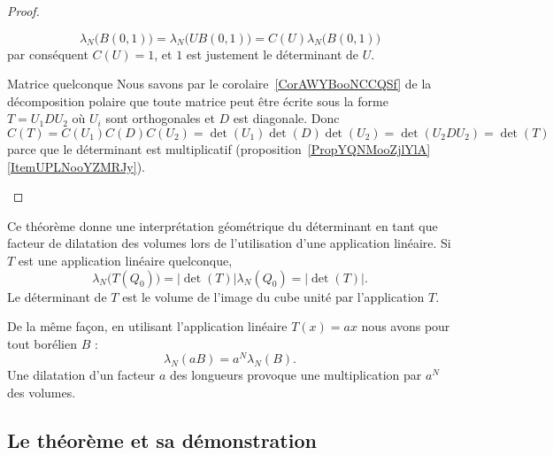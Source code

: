 \begin{proof}
\begin{subproof}
            \begin{equation}
                \lambda_N\big( B(0,1) \big)=\lambda_N\big( UB(0,1) \big)=C(U)\lambda_N\big( B(0,1) \big)
            \end{equation}
            par conséquent \( C(U)=1\), et \( 1\) est justement le déterminant de \( U\).
        \item[Matrice quelconque]
            Nous savons par le corolaire~\ref{CorAWYBooNCCQSf} de la décomposition polaire que toute matrice peut être écrite sous la forme \( T=U_1DU_2\) où \( U_i\) sont orthogonales et \( D\) est diagonale. Donc \( C(T)=C(U_1)C(D)C(U_2)=\det(U_1)\det(D)\det(U_2)=\det(U_2DU_2)=\det(T)\) parce que le déterminant est multiplicatif (proposition~\ref{PropYQNMooZjlYlA}\ref{ItemUPLNooYZMRJy}).
    \end{subproof}
\end{proof}

Ce théorème donne une interprétation géométrique du déterminant en tant que facteur de dilatation des volumes lors de l'utilisation d'une application linéaire. Si \( T\) est une application linéaire quelconque,
\begin{equation}
    \lambda_N\big( T(Q_0) \big)=| \det(T) |\lambda_N(Q_0)=| \det(T) |.
\end{equation}
Le déterminant de \( T\) est le volume de l'image du cube unité par l'application \( T\).

De la même façon, en utilisant l'application linéaire \( T(x)=ax\) nous avons pour tout borélien \( B\) :
\begin{equation}
    \lambda_N(aB)=a^N\lambda_N(B).
\end{equation}
Une dilatation d'un facteur \( a\) des longueurs provoque une multiplication par \( a^N\) des volumes.

\subsection{Le théorème et sa démonstration}

